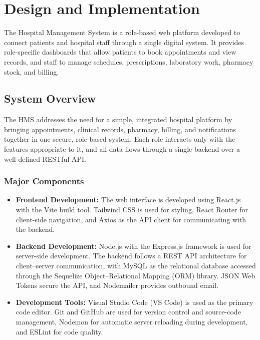 \documentclass[12pt,a4paper]{report}
\begin{document}
\chapter{Design and Implementation}
The Hospital Management System is a role-based web platform developed to connect
patients and hospital staff through a single digital system. It provides role-specific
dashboards that allow patients to book appointments and view records, and staff to
manage schedules, prescriptions, laboratory work, pharmacy stock, and billing.

\section{System Overview}
The HMS addresses the need for a simple, integrated hospital platform by bringing
appointments, clinical records, pharmacy, billing, and notifications together in one
secure, role-based system. Each role interacts only with the features appropriate to
it, and all data flows through a single backend over a well-defined RESTful API.

\subsection{Major Components}
\begin{itemize}[leftmargin=1.4em]
  \item \textbf{Frontend Development:} The web interface is developed using React.js
        with the Vite build tool. Tailwind CSS is used for styling, React Router for
        client-side navigation, and Axios as the API client for communicating with the
        backend.
  \item \textbf{Backend Development:} Node.js with the Express.js framework is used for
        server-side development. The backend follows a REST API architecture for
        client--server communication, with MySQL as the relational database accessed
        through the Sequelize Object--Relational Mapping (ORM) library. JSON Web Tokens
        secure the API, and Nodemailer provides outbound email.
  \item \textbf{Development Tools:} Visual Studio Code (VS Code) is used as the primary
        code editor. Git and GitHub are used for version control and source-code
        management, Nodemon for automatic server reloading during development, and
        ESLint for code quality.
\end{itemize}
\end{document}
